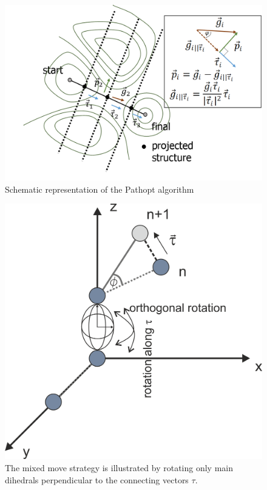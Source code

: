 \documentclass[a4paper,11pt]{scrartcl}
\begin{document}
\begin{figure}[H]
		\center
		\includegraphics[scale=0.4]{Pathopt/MCM_scheme_new.png}\caption{Schematic representation of the Pathopt algorithm}
\label{fig:MCM}
\end{figure}

\begin{figure}[H]
		\center
		\includegraphics[scale=0.6]{Pathopt/grafik_rot_scheme.png}\caption{The mixed move strategy is illustrated by rotating only main dihedrals perpendicular to the connecting vectors $\tau$.}
\label{fig:MIX}
\end{figure}
\end{document}
